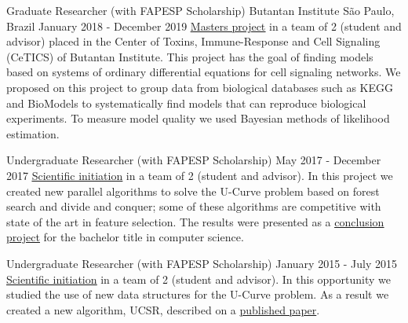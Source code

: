\documentclass[11pt, a4paper]{awesome-cv-res}
\begin{document}
\begin{cventries}
\cventry
{Graduate Researcher (with FAPESP Scholarship)}
{Butantan Institute}
{São Paulo, Brazil}
{January 2018 - December 2019}
{\href{https://bv.fapesp.br/en/bolsas/175684/identification-of-cell-signaling-pathways-based-on-biochemical-reaction-kinetics-repositories/}
{\color{awesome}\underline {Masters project}} in a team of 2 (student 
    and advisor) placed in the Center of Toxins, Immune-Response and 
    Cell Signaling (CeTICS) of Butantan Institute. This project has the 
    goal of finding models based on systems of ordinary differential 
    equations for cell signaling networks. We proposed on this project 
    to group data from biological databases such as KEGG and BioModels 
    to systematically find models that can reproduce biological 
    experiments. To measure model quality we used Bayesian methods of 
    likelihood estimation.}

\cventry
{Undergraduate Researcher (with FAPESP Scholarship)}
{}
{}
{May 2017 - December 2017}
{\href{https://bv.fapesp.br/en/bolsas/170553/design-of-poset-forest-based-algorithms-for-the-u-curve-optimization-problem/}
{\color{awesome} \underline{Scientific initiation}} in a team of 2 
    (student and advisor). In this project we created new parallel 
    algorithms to solve the U-Curve problem based on forest search and 
    divide and conquer; some of these algorithms are competitive with 
    state of the art in feature selection. The results were presented 
    as a \href{http://linux.ime.usp.br/~gustavoem/mac0499}
    {\color{awesome} \underline{conclusion project}} for the bachelor 
    title in computer science.}

\cventry
{Undergraduate Researcher (with FAPESP Scholarship)}
{}
{}
{January 2015 - July 2015}
{\href{https://bv.fapesp.br/en/bolsas/156441/studies-of-efficient-data-structures-to-tackle-the-u-curve-optimization-problem/}
{\color{awesome} \underline{Scientific initiation}} in a team of 2 
    (student and advisor). In this opportunity we studied the use of new 
    data structures for the U-Curve problem. As a result we created a 
    new algorithm, UCSR, described on a \href{https://www.sciencedirect.com/science/article/pii/S0020025518306789?via\%3Dihub}
    {published paper}.}


\end{cventries}
\end{document}

